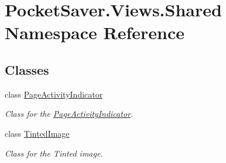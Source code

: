 \hypertarget{namespace_pocket_saver_1_1_views_1_1_shared}{}\section{Pocket\+Saver.\+Views.\+Shared Namespace Reference}
\label{namespace_pocket_saver_1_1_views_1_1_shared}
\subsection*{Classes}
\begin{DoxyCompactItemize}
\item 
class \hyperlink{class_pocket_saver_1_1_views_1_1_shared_1_1_page_activity_indicator}{Page\+Activity\+Indicator}
\begin{DoxyCompactList}\small\item\em Class for the \hyperlink{class_pocket_saver_1_1_views_1_1_shared_1_1_page_activity_indicator}{Page\+Activity\+Indicator}. \end{DoxyCompactList}\item 
class \hyperlink{class_pocket_saver_1_1_views_1_1_shared_1_1_tinted_image}{Tinted\+Image}
\begin{DoxyCompactList}\small\item\em Class for the Tinted image. \end{DoxyCompactList}\end{DoxyCompactItemize}
